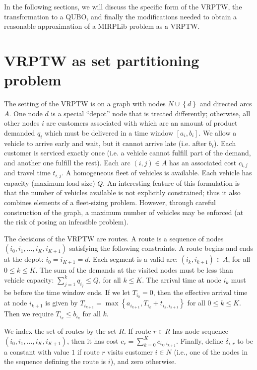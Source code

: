 \documentclass[11pt]{article}
\theoremstyle{definition}
\newcommand{\set}[1]{\left\{ #1 \right\}}
\newcommand{\smallsum}{{\textstyle{\sum}}}
\newcommand{\0}{\mathbf{0}}
\begin{document}
In the following sections, we will discuss the specific form of the VRPTW, the transformation to a QUBO,  and finally the modifications needed to obtain a reasonable approximation of a MIRPLib problem as a VRPTW.

\section{VRPTW as set partitioning problem}

The setting of the VRPTW is on a graph with nodes $N \cup \set{d}$ and directed arcs $A$.
One node $d$ is a special ``depot'' node that is treated differently;
otherwise, all other nodes $i$ are customers associated with which are an amount of product demanded $q_i$ which must be delivered in a time window $[a_i,b_i]$.
We allow a vehicle to arrive early and wait, but it cannot arrive late (i.e. after $b_i$).
Each customer is serviced exactly once (i.e. a vehicle cannot fulfill part of the demand, and another one fulfill the rest).
Each arc $(i,j) \in A$ has an associated cost $c_{i,j}$ and travel time $t_{i,j}$.
A homogeneous fleet of vehicles is available.
Each vehicle has capacity (maximum load size) $Q$.
An interesting feature of this formulation is that the number of vehicles available is not explicitly constrained; 
thus it also combines elements of a fleet-sizing problem.
However, through careful construction of the graph, a maximum number of vehicles may be enforced (at the risk of posing an infeasible problem).

The decisions of the VRPTW are routes.
A route is a sequence of nodes $(i_0, i_1, \dots , i_K, i_{K+1})$ satisfying the following constraints.
A route begins and ends at the depot: $i_0 = i_{K+1} = d$.
Each segment is a valid arc: $(i_k,i_{k+1}) \in A$, for all $0 \le k \le K$.
The sum of the demands at the visited nodes must be less than vehicle capacity: $\smallsum_{j=1}^{k} q_{i_j} \le Q$, for all $k \le K$.
The arrival time at node $i_k$ must be before the time window ends.
If we let $T_{i_0} = 0$, then the effective arrival time at node $i_{k+1}$ is given by
$T_{i_{k+1}} = \max\set{a_{i_{k+1}}, T_{i_k} + t_{i_k,i_{k+1}} }$ for all $0 \le k \le K$.
Then we require $T_{i_k} \le b_{i_k}$ for all $k$.

We index the set of routes by the set $R$.
If route $r \in R$ has node sequence $(i_0, i_1, \dots , i_K, i_{K+1})$, then it has cost $c_r = \smallsum_{k=0}^{K} c_{i_k,i_{k+1}}$.
Finally, define $\delta_{i,r}$ to be a constant with value $1$ if route $r$ visits customer $i \in N$
(i.e., one of the nodes in the sequence defining the route is $i$), 
and zero otherwise.
\end{document}
